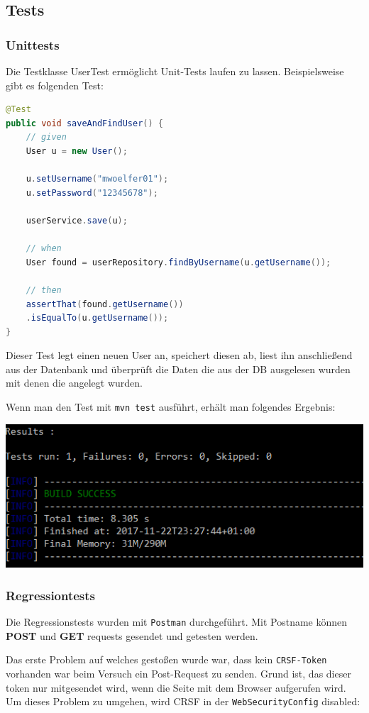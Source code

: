 \subsection{Tests}
\subsubsection{Unittests}
Die Testklasse UserTest ermöglicht Unit-Tests laufen zu lassen. Beispielsweise gibt es folgenden Test:

\begin{lstlisting}[language=Java]
@Test
public void saveAndFindUser() {
	// given
	User u = new User();
	
	u.setUsername("mwoelfer01");
	u.setPassword("12345678");
	
	userService.save(u);
	
	// when
	User found = userRepository.findByUsername(u.getUsername());
	
	// then
	assertThat(found.getUsername())
	.isEqualTo(u.getUsername());
}
\end{lstlisting}

Dieser Test legt einen neuen User an, speichert diesen ab, liest ihn anschließend aus der Datenbank und überprüft die Daten die aus der DB ausgelesen wurden mit denen die angelegt wurden.

Wenn man den Test mit \verb|mvn test| ausführt, erhält man folgendes Ergebnis:

\begin{minipage}{\linewidth}
	\centering
	\includegraphics[width=0.6\linewidth]{images/tests}
\end{minipage}

\subsubsection{Regressiontests}
Die Regressionstests wurden mit \verb|Postman| durchgeführt. Mit Postname können \textbf{POST} und \textbf{GET} requests gesendet und getesten werden.

Das erste Problem auf welches gestoßen wurde war, dass kein \verb|CRSF-Token| vorhanden war beim Versuch ein Post-Request zu senden. Grund ist, das dieser token nur mitgesendet wird, wenn die Seite mit dem Browser aufgerufen wird. Um dieses Problem zu umgehen, wird CRSF in der \verb|WebSecurityConfig| disabled:

